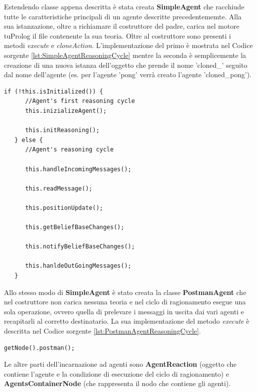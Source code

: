 \documentclass[12pt,a4paper,openright,twoside]{report}
\begin{document}
Estendendo classe appena descritta \`e stata creata \textbf{SimpleAgent} che racchiude tutte le caratteristiche principali di un agente descritte precedentememte. Alla sua istanzazione, oltre a richiamare il costruttore del padre, carica nel motore tuProlog il file contenente la sua teoria. Oltre al costruttore sono presenti i metodi \textit{execute} e \textit{cloneAction}. L'implementazione del primo \`e mostrata nel Codice sorgente \ref{lst:SimpleAgentReasoningCycle} mentre la seconda \`e semplicemente la creazione di una nuova istanza dell'oggetto che prende il nome 'cloned\_' seguito dal nome dell'agente (es. per l'agente 'pong' verr\`a creato l'agente 'cloned\_pong').
\medskip
\begin{lstlisting}[firstnumber=1,label={lst:SimpleAgentReasoningCycle},caption={Simple Agent Reasoning Cycle}]
   if (!this.isInitialized()) {
      //Agent's first reasoning cycle
      this.inizializeAgent();

      this.initReasoning();
   } else {
      //Agent's reasoning cycle

      this.handleIncomingMessages();

      this.readMessage();

      this.positionUpdate();

      this.getBeliefBaseChanges();

      this.notifyBeliefBaseChanges();

      this.hanldeOutGoingMessages();
   }
\end{lstlisting}

Allo stesso modo di \textbf{SimpleAgent} \`e stato creata la classe \textbf{PostmanAgent} che nel costruttore non carica nessuna teoria e nel ciclo di ragionamento esegue una sola operazione, ovvero quella di prelevare i messaggi in uscita dai vari agenti e recapitarli al corretto destinatario. La sua implementazione del metodo \textit{execute} \`e descritta nel Codice sorgente \ref{lst:PostmanAgentReasoningCycle}.

\medskip
\begin{lstlisting}[firstnumber=1,label={lst:PostmanAgentReasoningCycle},caption={Postman Agent Reasoning Cycle}]
   getNode().postman();
\end{lstlisting}


\bigskip

Le altre parti dell'incarnazione ad agenti sono \textbf{AgentReaction} (oggetto che contiene l'agente e la condizione di esecuzione del ciclo di ragionamento) e \textbf{AgentsContainerNode} (che rappresenta il nodo che contiene gli agenti).
\end{document}
